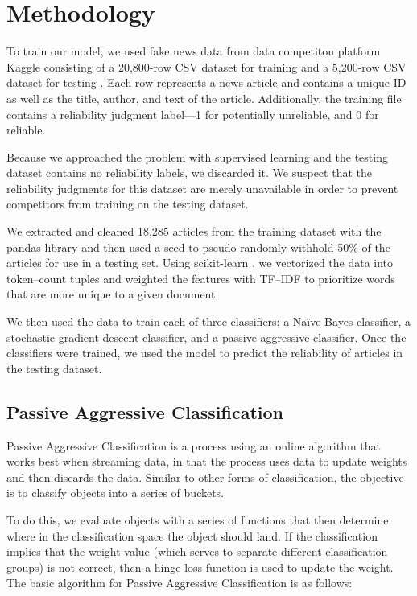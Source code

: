 \documentclass[12pt]{article}
\begin{document}
	\section{Methodology}

	To train our model, we used fake news data from data competiton platform Kaggle consisting of a 20,800-row CSV dataset for training and a 5,200-row CSV dataset for testing \cite{kaggle}. Each row represents a news article and contains a unique ID as well as the title, author, and text of the article. Additionally, the training file contains a reliability judgment label---1 for potentially unreliable, and 0 for reliable.

	Because we approached the problem with supervised learning and the testing dataset contains no reliability labels, we discarded it. We suspect that the reliability judgments for this dataset are merely unavailable in order to prevent competitors from training on the testing dataset.

	We extracted and cleaned 18,285 articles from the training dataset with the pandas library \cite{pandas} and then used a seed to pseudo-randomly withhold 50\% of the articles for use in a testing set. Using scikit-learn \cite{scikit-learn}, we vectorized the data into token--count tuples and weighted the features with TF--IDF to prioritize words that are more unique to a given document.

	We then used the data to train each of three classifiers: a Naïve Bayes classifier, a stochastic gradient descent classifier, and a passive aggressive classifier. Once the classifiers were trained, we used the model to predict the reliability of articles in the testing dataset.

	\subsection{Passive Aggressive Classification}

    Passive Aggressive Classification is a process using an online algorithm that works best when streaming data, in that the process uses data to update weights and then discards the data. Similar to other forms of classification, the objective is to classify objects into a series of buckets.

    To do this, we evaluate objects with a series of functions that then determine where in the classification space the object should land. If the classification implies that the weight value (which serves to separate different classification groups) is not correct, then a hinge loss function is used to update the weight.
    \break
    The basic algorithm for Passive Aggressive Classification is as follows:
    \break
\end{document}
